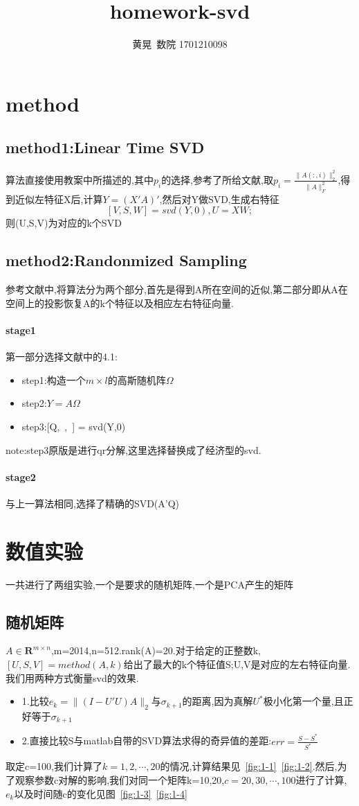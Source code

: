 \documentclass[UTF8]{ctexart}
\author{黄晃\ 数院 1701210098 }
\title{homework-svd}
\begin{document}
  \maketitle


\section{method}

\subsection{method1:Linear Time SVD}
算法直接使用教案中所描述的,其中$p_i$的选择,参考了所给文献,取$p_i=\frac{\|A(:,i)\|_2^2}{\|A\|_F^2}$,得到近似左特征X后,计算$Y=(X'A)'$,然后对Y做SVD,生成右特征
$$
[V,S,W] = svd(Y,0),U=XW;
$$
则(U,S,V)为对应的k个SVD
\subsection{method2:Randonmized Sampling}
参考文献中,将算法分为两个部分,首先是得到A所在空间的近似,第二部分即从A在空间上的投影恢复A的k个特征以及相应左右特征向量.
\paragraph{stage1}
第一部分选择文献中的4.1:
\begin{itemize}
  \item step1:构造一个$m\times l$的高斯随机阵$\Omega$
  \item step2:$Y=A\Omega$
  \item step3:[Q,~,~] = svd(Y,0)
  \end{itemize}
note:step3原版是进行qr分解,这里选择替换成了经济型的svd.

\paragraph{stage2}
与上一算法相同,选择了精确的SVD(A'Q)

\section{数值实验}
一共进行了两组实验,一个是要求的随机矩阵,一个是PCA产生的矩阵
\subsection{随机矩阵}
$A\in \mathbf{R}^{m\times n}$,m=2014,n=512.rank(A)=20.对于给定的正整数k,$[U,S,V]=method(A,k)$给出了最大的k个特征值S;U,V是对应的左右特征向量.我们用两种方式衡量svd的效果.
\begin{itemize}
  \item 1.比较$e_k=\|(I-U'U)A\|_2$与$\sigma_{k+1}$的距离,因为真解$U^*$极小化第一个量,且正好等于$\sigma_{k+1}$
  \item 2.直接比较S与matlab自带的SVD算法求得的奇异值的差距:$err=\frac{S-S^*}{S^*}$
\end{itemize}
取定c=100,我们计算了$k=1,2,\cdots,20$的情况,计算结果见~\ref{fig:1-1}~\ref{fig:1-2}.然后,为了观察参数c对解的影响,我们对同一个矩阵k=10,20,$c=20,30,\cdots,100$进行了计算,$e_k$以及时间随c的变化见图~\ref{fig:1-3}~\ref{fig:1-4}
\end{document}
